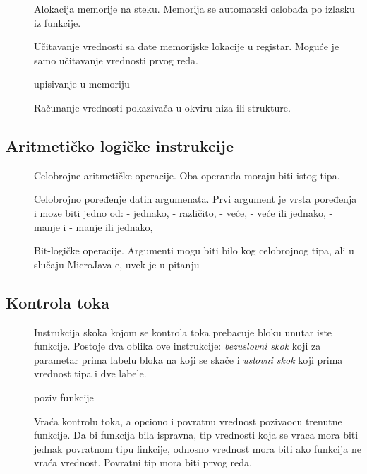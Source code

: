\begin{description}
\item[] Alokacija memorije na steku. Memorija se automatski oslobađa po izlasku iz funkcije.
\item[] Učitavanje vrednosti sa date memorijske lokacije u registar. Moguće je samo učitavanje vrednosti prvog reda.
\item[] upisivanje u memoriju
\item[] Računanje vrednosti pokazivača u okviru niza ili strukture.
\end{description}

\subsection*{Aritmetičko logičke instrukcije}

\begin{description}
\item[] Celobrojne aritmetičke operacije. Oba operanda moraju biti istog tipa.
\item[] Celobrojno poređenje datih argumenata. Prvi argument je vrsta poređenja i moze biti
jedno od:  - jednako,   - različito,  - veće,  - veće ili jednako,   - manje i   - manje ili jednako, 
\item[] Bit-logičke operacije. Argumenti mogu biti bilo kog celobrojnog tipa, ali u slučaju MicroJava-e, uvek je u pitanju 
\end{description}

\subsection*{Kontrola toka}

\begin{description}
\item[] Instrukcija skoka kojom se kontrola toka prebacuje bloku unutar iste funkcije. Postoje dva oblika ove instrukcije: \textit{bezuslovni skok} koji za parametar prima labelu bloka na koji se skače i \textit{uslovni skok} koji prima vrednost tipa  i dve labele.
\item[] poziv funkcije
\item[] Vraća kontrolu toka, a opciono i povratnu vrednost pozivaocu trenutne funkcije. Da bi funkcija bila ispravna, tip vrednosti koja se vraca mora biti jednak povratnom tipu finkcije, odnosno vrednost mora biti  ako funkcija ne vraća vrednost. Povratni tip mora biti prvog reda.
\end{description}


